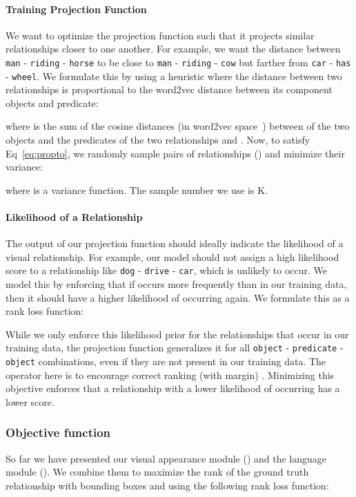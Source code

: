 \documentclass[runningheads]{llncs}
\newcommand{\relationship}[3]{\texttt{#1} - \texttt{#2} - \texttt{#3}}
\begin{document}
\paragraph{Training Projection Function}
We want to optimize the projection function  such that it projects similar relationships closer to one another. For example, we want the distance between \relationship{man}{riding}{horse} to be close to  \relationship{man}{riding}{cow} but farther from \relationship{car}{has}{wheel}. We formulate this by using a heuristic where the distance between two relationships is proportional to the word2vec distance between its component objects and predicate:
{\small

}
where  is the sum of the cosine distances (in word2vec space~\cite{mikolov2013efficient}) between of the two objects and the predicates of the two relationships  and . Now, to satisfy Eq~\ref{eq:propto}, we randomly sample pairs of relationships () and minimize their variance:
{\small

}
where  is a variance function. The sample number we use is K. 

\paragraph{Likelihood of a Relationship}
The output of our projection function should ideally indicate the likelihood of a visual relationship. For example, our model should not assign a high likelihood score to a relationship like \relationship{dog}{drive}{car}, which is unlikely to occur. We model this by enforcing that if  occurs more frequently than  in our training data, then it should have a higher likelihood of occurring again. We formulate this as a rank loss function:


{\small

}
While we only enforce this likelihood prior for the relationships that occur in our training data, the projection function  generalizes it for all \relationship{object}{predicate}{object} combinations, even if they are not present in our training data. The  operator here is to encourage correct ranking (with margin) . Minimizing this objective enforces that a relationship with a lower likelihood of occurring has a lower  score.

\subsubsection{Objective function}
\label{sec:objective_function}
So far we have presented  our visual appearance module () and the language module (). We combine them to maximize the rank of the ground truth relationship  with bounding boxes  and  using the following rank loss function:
{\small

}
\end{document}
